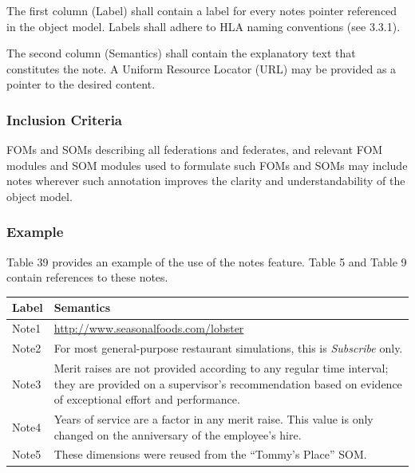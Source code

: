 \newpage
The first column (Label) shall contain a label for every notes pointer referenced in the object model. Labels shall adhere to HLA naming conventions (see 3.3.1).

The second column (Semantics) shall contain the explanatory text that constitutes the note. A Uniform Resource Locator (URL) may be provided as a pointer to the desired content.

\subsubsection{Inclusion Criteria}
FOMs and SOMs describing all federations and federates, and relevant FOM modules and SOM modules used to formulate such FOMs and SOMs may include notes wherever such annotation improves the clarity and understandability of the object model.

\subsubsection{Example}
Table 39 provides an example of the use of the notes feature. Table 5 and Table 9 contain references to these notes.

\begingroup
\fontsize{7.85}{9.0}\selectfont
\setlength{\tabcolsep}{5pt}
\renewcommand{\arraystretch}{1.11}
\noindent\begin{tabularx}{\textwidth}{|C{58pt}|Y|}
\hline
\bfseries Label & \centering\arraybackslash\bfseries Semantics \\
\hline
Note1 & \url{http://www.seasonalfoods.com/lobster} \\
\hline
Note2 & For most general-purpose restaurant simulations, this is \textit{Subscribe} only. \\
\hline
Note3 & Merit raises are not provided according to any regular time interval; they are provided on a supervisor's recommendation based on evidence of exceptional effort and performance. \\
\hline
Note4 & Years of service are a factor in any merit raise. This value is only changed on the anniversary of the employee's hire. \\
\hline
Note5 & These dimensions were reused from the ``Tommy's Place'' SOM. \\
\hline
\end{tabularx}
\endgroup
